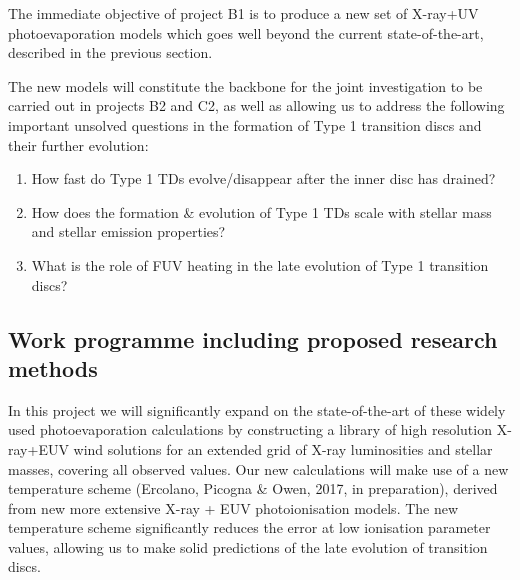 \documentclass[10pt,fleqn,twoside]{article}
\newcommand{\Tcol}{\color{blue}}
\begin{document}
The immediate objective of project B1 is to produce a new set of
X-ray+UV photoevaporation models which goes well beyond the current
state-of-the-art, described in the previous section. 

The new models will constitute the backbone for the joint
investigation to be carried out in projects B2 and C2, as well as
allowing us to address the following important unsolved questions in
the formation of Type 1 transition discs and their further evolution: 

\begin{enumerate}
\item How fast do Type 1 TDs evolve/disappear after the inner disc has
  drained?
\item How does the formation \& evolution of Type 1 TDs scale with
  stellar mass and stellar emission properties?
\item What is the role of FUV heating in the late evolution of Type 1
  transition discs? 
\end{enumerate}



\subsection{\Tcol Work programme including proposed research methods}
In this project we will significantly expand on the state-of-the-art of these widely used
photoevaporation calculations by constructing a
library of high resolution X-ray+EUV wind solutions for an extended grid of
X-ray luminosities and stellar masses, covering all observed
values. Our new calculations will make use of a new temperature
scheme (Ercolano, Picogna \& Owen, 2017, in preparation), derived from
new more extensive X-ray + EUV photoionisation models.  The new
temperature scheme
significantly reduces the error at low ionisation parameter values,
allowing us to make solid predictions of the late evolution of
transition discs. 
\end{document}
